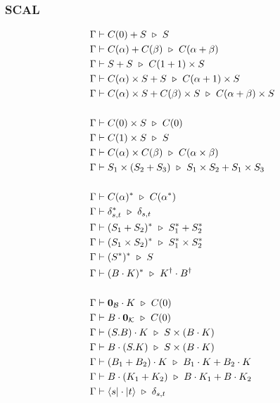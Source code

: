\subsubsection*{\textsf{SCAL}}
\begin{align*}
  & \Gamma \vdash C(0) + S \reduce S \\
  & \Gamma \vdash C(\alpha) + C(\beta) \reduce C(\alpha + \beta) \\
  & \Gamma \vdash S + S \reduce C(1 + 1) \times S \\
  & \Gamma \vdash C(\alpha) \times S + S \reduce C(\alpha + 1) \times S \\
  & \Gamma \vdash C(\alpha) \times S + C(\beta) \times S \reduce C(\alpha + \beta) \times S \\
  \\
  & \Gamma \vdash C(0) \times S \reduce C(0) \\
  & \Gamma \vdash C(1) \times S \reduce S \\
  & \Gamma \vdash C(\alpha) \times C(\beta) \reduce C(\alpha \times \beta) \\
  & \Gamma \vdash S_1 \times (S_2 + S_3) \reduce S_1 \times S_2 + S_1 \times S_3\\
  \\
  & \Gamma \vdash C(\alpha)^* \reduce C(\alpha^*) \\
  & \Gamma \vdash \delta_{s, t}^* \reduce \delta_{s, t} \\
  & \Gamma \vdash (S_1 + S_2)^* \reduce S_1^* + S_2^* \\
  & \Gamma \vdash (S_1 \times S_2)^* \reduce S_1^* \times S_2^* \\
  & \Gamma \vdash (S^*)^* \reduce S \\
  & \Gamma \vdash (B \cdot K)^* \reduce K^\dagger \cdot B^\dagger \\
  \\
  & \Gamma \vdash \mathbf{0}_\mathcal{B} \cdot K \reduce C(0) \\
  & \Gamma \vdash B \cdot \mathbf{0}_\mathcal{K} \reduce C(0) \\
  & \Gamma \vdash (S.B) \cdot K \reduce S \times (B \cdot K) \\
  & \Gamma \vdash B \cdot (S.K) \reduce S \times (B \cdot K) \\
  & \Gamma \vdash (B_1 + B_2) \cdot K \reduce B_1 \cdot K + B_2 \cdot K \\
  & \Gamma \vdash B \cdot (K_1 + K_2) \reduce B \cdot K_1 + B \cdot K_2 \\
  & \Gamma \vdash \bra{s} \cdot \ket{t} \reduce \delta_{s, t} \\

\end{align*}

